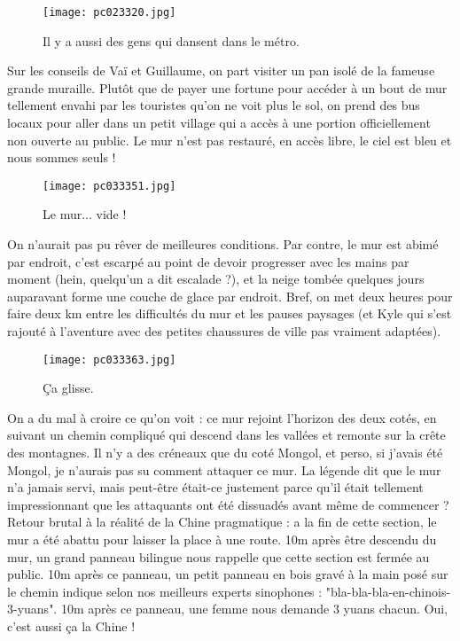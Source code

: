 \documentclass{book}
\begin{document}
\begin{figure}[H]
\centering
\texttt{[image: pc023320.jpg]}
\caption*{ Il y a aussi des gens qui dansent dans le métro.}
\end{figure}

Sur les conseils de Vaï et Guillaume, on part visiter un pan isolé de la fameuse grande muraille. Plutôt que de payer une fortune pour accéder à un bout de mur tellement envahi par les touristes qu'on ne voit plus le sol, on prend des bus locaux pour aller dans un petit village qui a accès à une portion officiellement non ouverte au public. Le mur n'est pas restauré, en accès libre, le ciel est bleu et nous sommes seuls !


\begin{figure}[H]
\centering
\texttt{[image: pc033351.jpg]}
\caption*{ Le mur... vide !}
\end{figure}

On n'aurait pas pu rêver de meilleures conditions. Par contre, le mur est abimé par endroit, c'est escarpé au point de devoir progresser avec les mains par moment (hein, quelqu'un a dit escalade ?), et la neige tombée quelques jours auparavant forme une couche de glace par endroit. Bref, on met deux heures pour faire deux km entre les difficultés du mur et les pauses paysages (et Kyle qui s'est rajouté à l'aventure avec des petites chaussures de ville pas vraiment adaptées).


\begin{figure}[H]
\centering
\texttt{[image: pc033363.jpg]}
\caption*{ Ça glisse.}
\end{figure}

On a du mal à croire ce qu'on voit : ce mur rejoint l'horizon des deux cotés, en suivant un chemin compliqué qui descend dans les vallées et remonte sur la crête des montagnes. Il n'y a des créneaux que du coté Mongol, et perso, si j'avais été Mongol, je n'aurais pas su comment attaquer ce mur. La légende dit que le mur n'a jamais servi, mais peut-être était-ce justement parce qu'il était tellement impressionnant que les attaquants ont été dissuadés avant même de commencer ? Retour brutal à la réalité de la Chine pragmatique : a la fin de cette section, le mur a été abattu pour laisser la place à une route. 10m après être descendu du mur, un grand panneau bilingue nous rappelle que cette section est fermée au public. 10m après ce panneau, un petit panneau en bois gravé à la main posé sur le chemin indique selon nos meilleurs experts sinophones : "bla-bla-bla-en-chinois-3-yuans". 10m après ce panneau, une femme nous demande 3 yuans chacun. Oui, c'est aussi ça la Chine !
\end{document}
